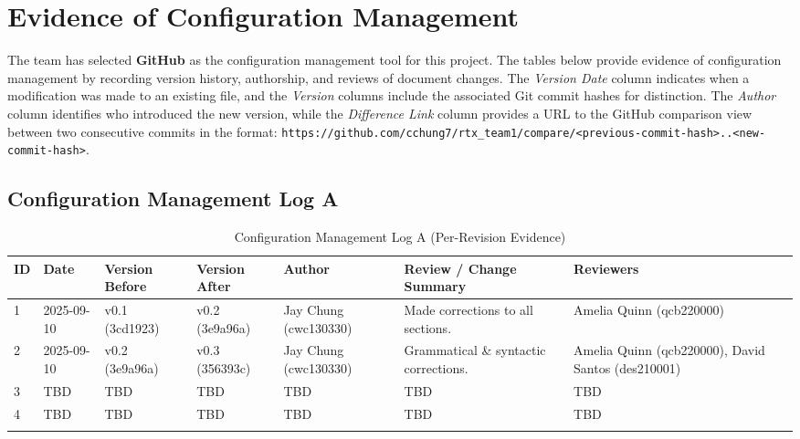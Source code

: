 \section{Evidence of Configuration Management}

The team has selected \textbf{GitHub} as the configuration management tool for this project. The tables below provide evidence of configuration management by recording version history, authorship, and reviews of document changes. The \emph{Version Date} column indicates when a modification was made to an existing file, and the \emph{Version} columns include the associated Git commit hashes for distinction. The \emph{Author} column identifies who introduced the new version, while the \emph{Difference Link} column provides a URL to the GitHub comparison view between two consecutive commits in the format: \texttt{https://github.com/cchung7/rtx\_team1/compare/\textless previous-commit-hash\textgreater..\textless new-commit-hash\textgreater}.

\begingroup
    \small
    \setlength{\LTpre}{0pt}
    \setlength{\LTpost}{0pt}

    \subsection*{Configuration Management Log A}
        \begin{longtable}{p{0.5cm}<{\raggedright} p{1.5cm}<{\raggedright} p{1.7cm}<{\raggedright} p{1.7cm}<{\raggedright} p{2.2cm}<{\raggedright} p{2.7cm}<{\raggedright} p{2cm}}
            \caption{Configuration Management Log A (Per-Revision Evidence)}\label{tab:cmlogA}\\
            \hline
            \textbf{ID} & \textbf{Date} & \textbf{Version Before} & \textbf{Version After} & \textbf{Author} & \textbf{Review / Change Summary} & \textbf{Reviewers} \\
            \hline
            \arrayrulecolor{gray!30}

            1 & 2025-09-10  & v0.1 (3cd1923)    & v0.2 (3e9a96a)    & Jay Chung (cwc130330) & Made corrections to all sections.     & Amelia Quinn (qcb220000) \\
            \hline
            2 & 2025-09-10  & v0.2 (3e9a96a)    & v0.3 (356393c)    & Jay Chung (cwc130330) & Grammatical \& syntactic corrections. & Amelia Quinn (qcb220000), David Santos (des210001) \\
            \hline
            3 & TBD         & TBD               & TBD               & TBD                   & TBD                                   & TBD \\
            \hline
            4 & TBD         & TBD               & TBD               & TBD                   & TBD                                   & TBD \\
            
            \arrayrulecolor{black}
            \hline
        \end{longtable}
    
